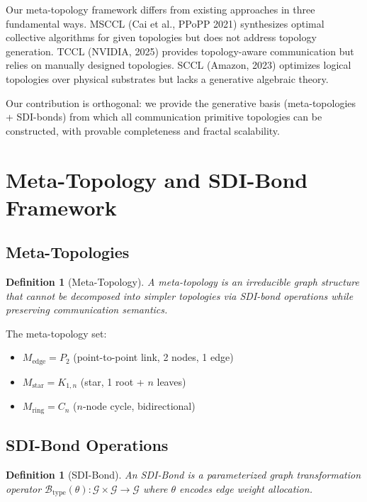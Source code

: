 \documentclass[12pt]{article}
\newtheorem{definition}[theorem]{Definition}
\begin{document}
Our meta-topology framework differs from existing approaches in
three fundamental ways. MSCCL (Cai et al., PPoPP 2021) synthesizes
optimal collective algorithms for given topologies but does not
address topology generation. TCCL (NVIDIA, 2025) provides
topology-aware communication but relies on manually designed
topologies. SCCL (Amazon, 2023) optimizes logical topologies over
physical substrates but lacks a generative algebraic theory.

Our contribution is orthogonal: we provide the generative basis
(meta-topologies + SDI-bonds) from which all communication primitive
topologies can be constructed, with provable completeness and fractal
scalability.

\section{Meta-Topology and SDI-Bond Framework}
\subsection{Meta-Topologies}

\begin{definition}[Meta-Topology]
A meta-topology is an irreducible graph structure that cannot be
decomposed into simpler topologies via SDI-bond operations while
preserving communication semantics.
\end{definition}

The meta-topology set:
\begin{itemize}
\item $M_{\text{edge}} = P_2$ (point-to-point link, 2 nodes, 1 edge)
\item $M_{\text{star}} = K_{1,n}$ (star, 1 root + $n$ leaves)
\item $M_{\text{ring}} = C_n$ ($n$-node cycle, bidirectional)
\end{itemize}

\subsection{SDI-Bond Operations}

\begin{definition}[SDI-Bond]
An SDI-Bond is a parameterized graph transformation operator
$\mathcal{B}_{\text{type}}(\theta): \mathcal{G} \times \mathcal{G}
\to \mathcal{G}$ where $\theta$ encodes edge weight allocation.
\end{definition}
\end{document}
